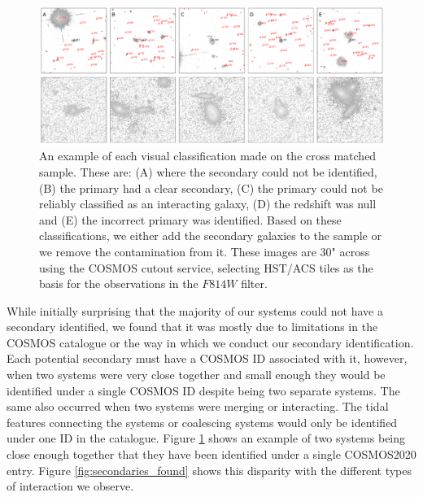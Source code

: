\begin{figure}
    \centering
    \includegraphics[width=\textwidth]{Chapter3/figures/cutouts_ex.pdf}
    \caption[An example of each visual classification made on the cross matched sample.]{An example of each visual classification made on the cross matched sample. These are: (A) where the secondary could not be identified, (B) the primary had a clear secondary, (C) the primary could not be reliably classified as an interacting galaxy, (D) the redshift was null and (E) the incorrect primary was identified. Based on these classifications, we either add the secondary galaxies to the sample or we remove the contamination from it. These images are 30" across using the COSMOS cutout service, selecting HST/ACS tiles as the basis for the observations in the $F814W$ filter.}
    \label{fig:secondary_selection}
\end{figure}

While initially surprising that the majority of our systems could not have a secondary identified, we found that it was mostly due to limitations in the COSMOS catalogue or the way in which we conduct our secondary identification. Each potential secondary must have a COSMOS ID associated with it, however, when two systems were very close together and small enough they would be identified under a single COSMOS ID despite being two separate systems. The same also occurred when two systems were merging or interacting. The tidal features connecting the systems or coalescing systems would only be identified under one ID in the catalogue. Figure \ref{fig:secondary_selection} shows an example of two systems being close enough together that they have been identified under a single COSMOS2020 entry. Figure \ref{fig:secondaries_found} shows this disparity with the different types of interaction we observe.

